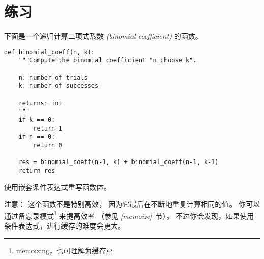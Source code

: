 \section{练习}

\begin{exercise}


下面是一个递归计算二项式系数 {\em (binomial coefficient)} 的函数。

\begin{em}
\begin{lstlisting}
def binomial_coeff(n, k):
    """Compute the binomial coefficient "n choose k".

    n: number of trials
    k: number of successes

    returns: int
    """
    if k == 0:
        return 1
    if n == 0:
        return 0

    res = binomial_coeff(n-1, k) + binomial_coeff(n-1, k-1)
    return res
\end{lstlisting}
\end{em}


使用嵌套条件表达式重写函数体。


注意： 这个函数不是特别高效， 因为它最后在不断地重复计算相同的值。  
你可以通过备忘录模式\footnote{memoizing，也可理解为缓存} 来提高效率
（参见 {\em \ref{memoize}}~节）。  
不过你会发现，如果使用条件表达式，进行缓存的难度会更大。

\end{exercise}